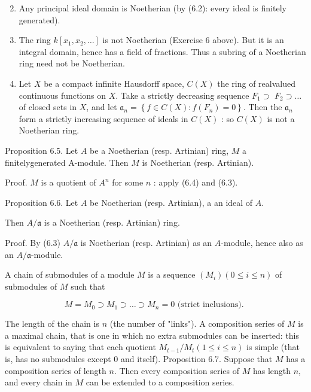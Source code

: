 \documentclass{standalone}
\theoremstyle{definition}
\theoremstyle{remark}
\begin{document}
\begin{enumerate}
  \setcounter{enumi}{1}
  \item Any principal ideal domain is Noetherian (by (6.2): every ideal is finitely generated).

  \item The ring $k\left[x_{1}, x_{2}, \ldots\right]$ is not Noetherian (Exercise 6 above). But it is an integral domain, hence has a field of fractions. Thus a subring of a Noetherian ring need not be Noetherian.

  \item Let $X$ be a compact infinite Hausdorff space, $C(X)$ the ring of realvalued continuous functions on $X$. Take a strictly decreasing sequence $F_{1} \supset$ $F_{2} \supset \ldots$ of closed sets in $X$, and let $\mathfrak{a}_{n}=\left\{f \in C(X): f\left(F_{n}\right)=0\right\}$. Then the $\mathfrak{a}_{n}$ form a strictly increasing sequence of ideals in $C(X)$ : so $C(X)$ is not a Noetherian ring.

\end{enumerate}

Proposition 6.5. Let $A$ be a Noetherian (resp. Artinian) ring, $M$ a finitelygenerated A-module. Then $M$ is Noetherian (resp. Artinian).

Proof. $M$ is a quotient of $A^{n}$ for some $n$ : apply (6.4) and (6.3).

Proposition 6.6. Let $A$ be Noetherian (resp. Artinian), a an ideal of $A$.

Then $A / \mathfrak{a}$ is a Noetherian (resp. Artinian) ring.

Proof. By (6.3) $A / \mathfrak{a}$ is Noetherian (resp. Artinian) as an $A$-module, hence also as an $A / \mathfrak{a}$-module.

A chain of submodules of a module $M$ is a sequence $\left(M_{i}\right)(0 \leqslant i \leqslant n)$ of submodules of $M$ such that

\[
M=M_{0} \supset M_{1} \supset \ldots \supset M_{n}=0 \text { (strict inclusions). }
\]

The length of the chain is $n$ (the number of "links"). A composition series of $M$ is a maximal chain, that is one in which no extra submodules can be inserted: this is equivalent to saying that each quotient $M_{t-1} / M_{t}(1 \leqslant i \leqslant n)$ is simple (that is, has no submodules except 0 and itself). Proposition 6.7. Suppose that $M$ has a composition series of length $n$. Then every composition series of $M$ has length $n$, and every chain in $M$ can be extended to a composition series.
\end{document}
